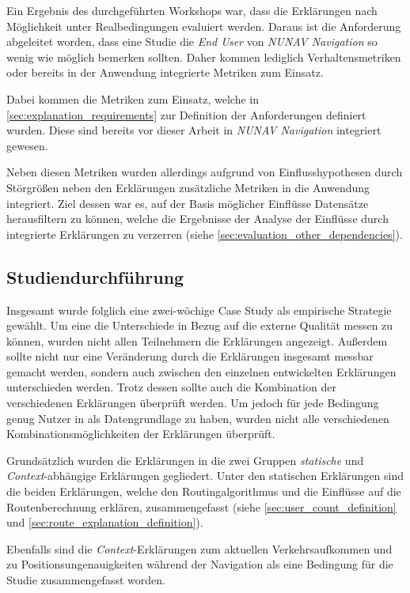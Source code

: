 Ein Ergebnis des durchgeführten Workshops war, dass die Erklärungen nach Möglichkeit unter Realbedingungen evaluiert werden. Daraus ist die Anforderung abgeleitet worden, dass eine Studie die \textit{End User} von \textit{NUNAV Navigation} so wenig wie möglich bemerken sollten. Daher kommen lediglich Verhaltensmetriken oder bereits in der Anwendung integrierte Metriken zum Einsatz.

Dabei kommen die Metriken zum Einsatz, welche in \autoref{sec:explanation_requirements} zur Definition der Anforderungen definiert wurden. Diese sind bereits vor dieser Arbeit in \textit{NUNAV Navigation} integriert gewesen.

Neben diesen Metriken wurden allerdings aufgrund von Einflusshypothesen durch Störgrößen neben den Erklärungen zusätzliche Metriken in die Anwendung integriert. Ziel dessen war es, auf der Basis möglicher Einflüsse Datensätze herausfiltern zu können, welche die Ergebnisse der Analyse der Einflüsse durch integrierte Erklärungen zu verzerren (siehe \autoref{sec:evaluation_other_dependencies}).

\subsection{Studiendurchführung}

Insgesamt wurde folglich eine zwei-wöchige Case Study als empirische Strategie gewählt. Um eine die Unterschiede in Bezug auf die externe Qualität messen zu können, wurden nicht allen Teilnehmern die Erklärungen angezeigt. Außerdem sollte nicht nur eine Veränderung durch die Erklärungen insgesamt messbar gemacht werden, sondern auch zwischen den einzelnen entwickelten Erklärungen unterschieden werden. Trotz dessen sollte auch die Kombination der verschiedenen Erklärungen überprüft werden. Um jedoch für jede Bedingung genug Nutzer in als Datengrundlage zu haben, wurden nicht alle verschiedenen Kombinationsmöglichkeiten der Erklärungen überprüft.

Grundsätzlich wurden die Erklärungen in die zwei Gruppen \textit{statische} und \textit{Context}-abhängige Erklärungen gegliedert. Unter den statischen Erklärungen sind die beiden Erklärungen, welche den Routingalgorithmus und die Einflüsse auf die Routenberechnung erklären, zusammengefasst (siehe \autoref{sec:user_count_definition} und \autoref{sec:route_explanation_definition}).

Ebenfalls sind die \textit{Context}-Erklärungen zum aktuellen Verkehrsaufkommen und zu Positionsungenauigkeiten während der Navigation als eine Bedingung für die Studie zusammengefasst worden.

